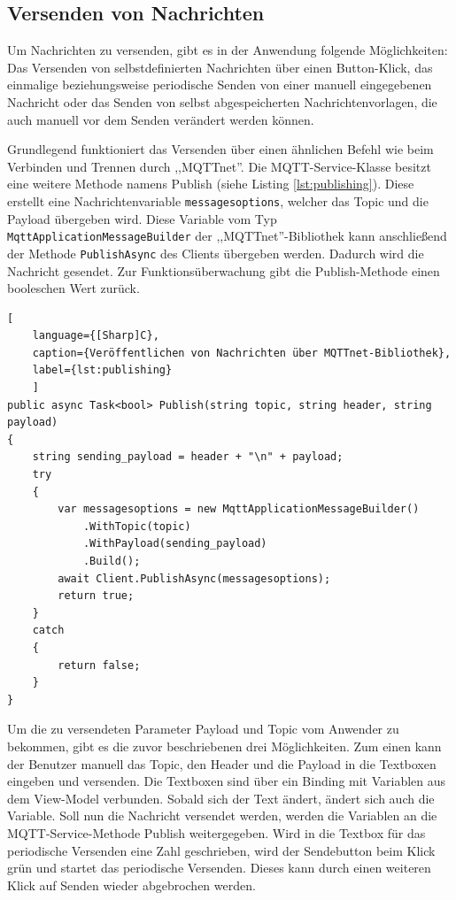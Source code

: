 \subsection{Versenden von Nachrichten}
Um Nachrichten zu versenden, gibt es in der Anwendung folgende Möglichkeiten: Das Versenden von selbstdefinierten Nachrichten über einen Button-Klick, das einmalige beziehungsweise periodische Senden von einer manuell eingegebenen Nachricht oder das Senden von selbst abgespeicherten Nachrichtenvorlagen, die auch manuell vor dem Senden verändert werden können.
 
 Grundlegend funktioniert das Versenden über einen ähnlichen Befehl wie beim Verbinden und Trennen durch ,,MQTTnet''. Die MQTT-Service-Klasse besitzt eine weitere Methode namens Publish (siehe Listing \ref{lst:publishing}). Diese erstellt eine Nachrichtenvariable \lstinline|messagesoptions|, welcher das Topic und die Payload übergeben wird. 
 Diese Variable vom Typ \lstinline|MqttApplicationMessageBuilder| der ,,MQTTnet''-Bibliothek kann anschließend der Methode \lstinline|PublishAsync| des Clients übergeben werden. Dadurch wird die Nachricht gesendet. Zur Funktionsüberwachung gibt die Publish-Methode einen booleschen Wert zurück.
  \begin{lstlisting}[
    language={[Sharp]C},
    caption={Veröffentlichen von Nachrichten über MQTTnet-Bibliothek},
    label={lst:publishing}
    ]
public async Task<bool> Publish(string topic, string header, string payload)
{
    string sending_payload = header + "\n" + payload;
    try
    {
        var messagesoptions = new MqttApplicationMessageBuilder()
            .WithTopic(topic)
            .WithPayload(sending_payload)
            .Build();
        await Client.PublishAsync(messagesoptions);
        return true; 
    }
    catch
    {
        return false;
    }
}
\end{lstlisting}
 
 Um die zu versendeten Parameter Payload und Topic vom Anwender zu bekommen, gibt es die zuvor beschriebenen drei Möglichkeiten. Zum einen kann der Benutzer manuell das Topic, den Header und die Payload in die Textboxen eingeben und versenden. Die Textboxen sind über ein Binding mit Variablen aus dem View-Model verbunden. Sobald sich der Text ändert, ändert sich auch die Variable.
 Soll nun die Nachricht versendet werden, werden die Variablen an die MQTT-Service-Methode Publish weitergegeben. Wird in die Textbox für das periodische Versenden eine Zahl geschrieben, wird der Sendebutton beim Klick grün und startet das periodische Versenden. Dieses kann durch einen weiteren Klick auf Senden wieder abgebrochen werden. 
 
